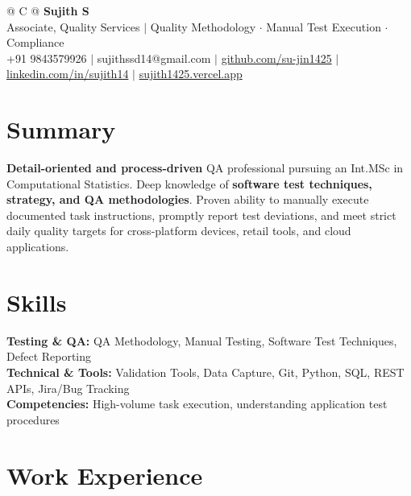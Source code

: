 \documentclass[a4paper,11pt]{article}
\newcommand{\ulink}[2]{\href{#1}{#2}}
\begin{document}
\pagestyle{empty}

\begin{tabularx}{\linewidth}{@{} C @{}}
{\color[HTML]{000000}\fontsize{30}{35}\selectfont\bfseries Sujith S} \\[5pt]
{\fontsize{10.5}{12.5}\selectfont\color[HTML]{3A3A3A}
Associate, Quality Services $|$ Quality Methodology $\cdot$ Manual Test Execution $\cdot$ Compliance} \\[6pt]
{\fontsize{9.5}{11.5}\selectfont\textcolor[HTML]{3A3A3A}{+91 9843579926 $|$ sujithssd14@gmail.com $|$ \ulink{https://github.com/su-jin1425}{github.com/su-jin1425} $|$ \ulink{https://linkedin.com/in/sujith14}{linkedin.com/in/sujith14} $|$ \ulink{https://sujith1425.vercel.app}{sujith1425.vercel.app}}}
\end{tabularx}

\section{Summary}
\vspace{2pt}

{\color[HTML]{0A0A0A}\fontsize{11}{14}\selectfont
\textbf{Detail-oriented and process-driven} QA professional pursuing an Int.MSc in Computational Statistics. Deep knowledge of \textbf{software test techniques, strategy, and QA methodologies}. Proven ability to manually execute documented task instructions, promptly report test deviations, and meet strict daily quality targets for cross-platform devices, retail tools, and cloud applications.}

\section{Skills}
\vspace{2pt}

{\color[HTML]{0A0A0A}\fontsize{11}{14}\selectfont
\textbf{Testing \& QA:} QA Methodology, Manual Testing, Software Test Techniques, Defect Reporting \\[2pt]
\textbf{Technical \& Tools:} Validation Tools, Data Capture, Git, Python, SQL, REST APIs, Jira/Bug Tracking \\[2pt]
\textbf{Competencies:} High-volume task execution, understanding application test procedures}

\section{Work Experience}
\vspace{2pt}
\end{document}
